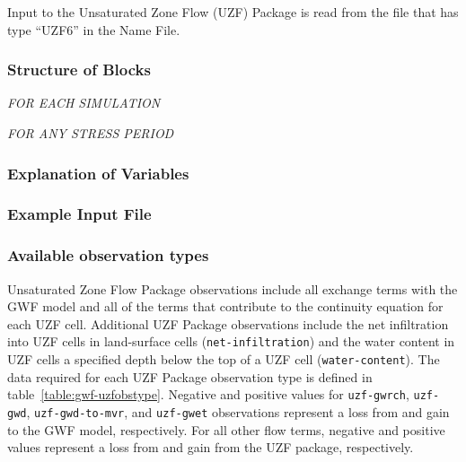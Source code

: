 Input to the Unsaturated Zone Flow (UZF) Package is read from the file that has type ``UZF6'' in the Name File.

\vspace{5mm}
\subsubsection{Structure of Blocks}
\vspace{5mm}

\noindent \textit{FOR EACH SIMULATION}




\vspace{5mm}
\noindent \textit{FOR ANY STRESS PERIOD}


\vspace{5mm}
\subsubsection{Explanation of Variables}
\begin{description}

\end{description}

\vspace{5mm}
\subsubsection{Example Input File}


\vspace{5mm}
\subsubsection{Available observation types}
Unsaturated Zone Flow Package observations include all exchange terms with the GWF model and all of the terms that contribute to the continuity equation for each UZF cell. Additional UZF Package observations include the net infiltration into UZF cells in land-surface cells (\texttt{net-infiltration}) and the water content in UZF cells a specified depth below the top of a UZF cell (\texttt{water-content}). The data required for each UZF Package observation type is defined in table~\ref{table:gwf-uzfobstype}. Negative and positive values for \texttt{uzf-gwrch}, \texttt{uzf-gwd}, \texttt{uzf-gwd-to-mvr}, and \texttt{uzf-gwet} observations represent a loss from and gain to the GWF model, respectively. For all other flow terms, negative and positive values represent a loss from and gain from the UZF package, respectively.

